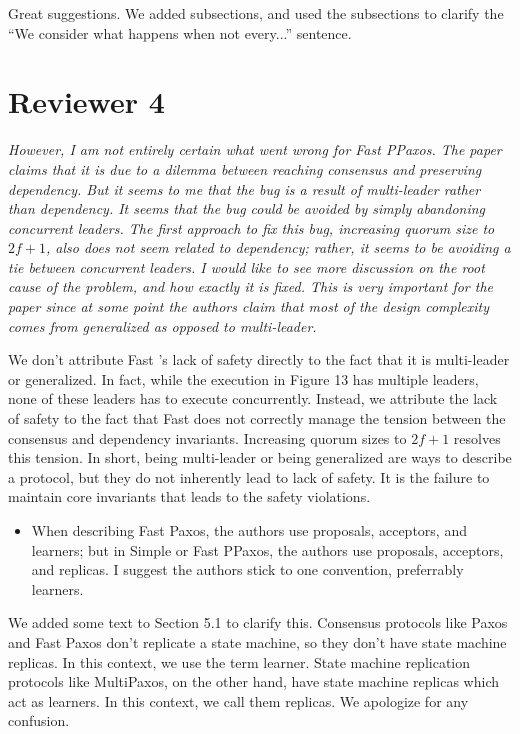 \documentclass[letterpaper,twocolumn,10pt]{article}
\newenvironment{reviewerquote}
{\list{}{\leftmargin=\parindent\rightmargin=0in}\item[] \itshape \color{ReviewerDarkGray}}%
{\endlist}
\begin{document}
Great suggestions. We added subsections, and used the subsections to clarify
the ``We consider what happens when not every...'' sentence.

\section*{Reviewer 4}
\begin{reviewerquote}
  However, I am not entirely certain what went wrong for Fast PPaxos. The paper
  claims that it is due to a dilemma between reaching consensus and preserving
  dependency. But it seems to me that the bug is a result of multi-leader
  rather than dependency. It seems that the bug could be avoided by simply
  abandoning concurrent leaders. The first approach to fix this bug, increasing
  quorum size to $2f+1$, also does not seem related to dependency; rather, it
  seems to be avoiding a tie between concurrent leaders. I would like to see
  more discussion on the root cause of the problem, and how exactly it is
  fixed. This is very important for the paper since at some point the authors
  claim that most of the design complexity comes from generalized as opposed to
  multi-leader.
\end{reviewerquote}

We don't attribute Fast \BPaxos{}'s lack of safety directly to the fact that it
is multi-leader or generalized. In fact, while the execution in Figure 13 has
multiple leaders, none of these leaders has to execute concurrently. Instead,
we attribute the lack of safety to the fact that Fast \BPaxos{} does not
correctly manage the tension between the consensus and dependency invariants.
Increasing quorum sizes to $2f+1$ resolves this tension. In short, being
multi-leader or being generalized are ways to describe a protocol, but they do
not inherently lead to lack of safety. It is the failure to maintain core
invariants that leads to the safety violations.

\begin{reviewerquote}
  \begin{itemize}
    \item
      When describing Fast Paxos, the authors use proposals, acceptors, and
      learners; but in Simple or Fast PPaxos, the authors use proposals,
      acceptors, and replicas. I suggest the authors stick to one convention,
      preferrably learners.
  \end{itemize}
\end{reviewerquote}

We added some text to Section 5.1 to clarify this. Consensus protocols like
Paxos and Fast Paxos don't replicate a state machine, so they don't have state
machine replicas. In this context, we use the term learner. State machine
replication protocols like MultiPaxos, on the other hand, have state machine
replicas which act as learners. In this context, we call them replicas. We
apologize for any confusion.
\end{document}
